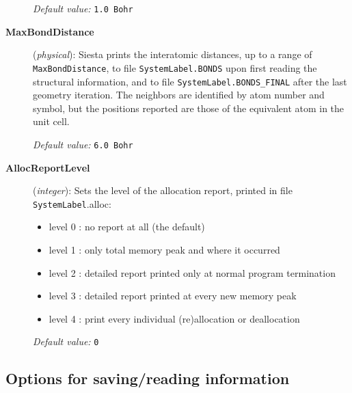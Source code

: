 \documentclass[11pt]{article}
\begin{document}
\begin{description}
{\it Default value:} {\tt 1.0 Bohr}

\item[{\bf MaxBondDistance}] ({\it physical}): 
{\sc Siesta} prints the interatomic
distances, up to
a range of {\tt MaxBondDistance}, to file 
{\tt SystemLabel.BONDS} upon first
reading the structural information, and to file
{\tt SystemLabel.BONDS\_FINAL}
after the last geometry iteration. The neighbors are identified by
atom number and symbol, but the positions reported are those of the
equivalent atom in the unit cell.

{\it Default value:} {\tt 6.0 Bohr}

        
\item[{\bf AllocReportLevel}] ({\it integer}): 
Sets the level of the allocation report, printed in file 
{\tt SystemLabel}.alloc:
\begin{itemize}
\item
  level 0 : no report at all (the default)
\item
  level 1 : only total memory peak and where it occurred
\item
  level 2 : detailed report printed only at 
            normal program termination
\item
  level 3 : detailed report printed at every new memory peak
\item
  level 4 : print every individual (re)allocation or deallocation
\end{itemize}

{\it Default value:} {\tt 0}

\end{description}



\vspace{5pt}
\subsection{Options for saving/reading information}
\end{document}
